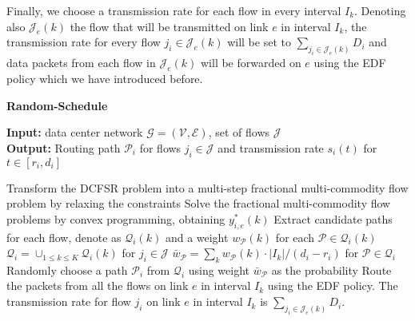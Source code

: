 \documentclass[10pt, conference, compsocconf]{IEEEtran}
\begin{document}
Finally, we choose a transmission rate for each flow in every interval $I_k$. Denoting also $\mathcal{J}_e(k)$ the flow that will be transmitted on link $e$ in interval $I_k$, the transmission rate for every flow $j_i \in \mathcal{J}_e(k)$ will be set to $\sum_{j_i \in \mathcal{J}_e(k)} D_i$ and data packets from each flow in $\mathcal{J}_e(k)$ will be forwarded on $e$ using the EDF policy which we have introduced before.

\begin{algorithm}[!t]
\caption{\label{alg:approx} \textbf{Random-Schedule}}
\textbf{Input:} data center network $\mathcal{G}=(\mathcal{V},\mathcal{E})$, set of flows $\mathcal{J}$\\
\textbf{Output:} Routing path $\mathcal{P}_i$ for flows $j_i \in \mathcal{J}$ and transmission rate $s_i(t)$ for $t \in [r_i,d_i]$

\begin{algorithmic}[1]
\STATE Transform the DCFSR problem into a multi-step fractional multi-commodity flow problem by relaxing the constraints
	\STATE Solve the fractional multi-commodity flow problems by convex programming, obtaining $y^*_{i,e}(k)$
	\STATE Extract candidate paths for each flow, denote as $\mathcal{Q}_i(k)$ and a weight $w_\mathcal{P}(k)$ for each $\mathcal{P} \in \mathcal{Q}_i(k)$
\ENDFOR
\STATE $\mathcal{Q}_i = \cup_{1\leq k\leq K} \mathcal{Q}_i(k)$ for $j_i \in \mathcal{J}$
\STATE $\bar{w}_\mathcal{P} = \sum_k w_\mathcal{P}(k) \cdot |I_k|/(d_i-r_i)$ for  $\mathcal{P} \in \mathcal{Q}_i$
\STATE Randomly choose a path $\mathcal{P}_i$ from $\mathcal{Q}_i$ using weight $\bar{w}_\mathcal{P}$ as the probability
\ENDFOR
\STATE Route the packets from all the flows on link $e$ in interval $I_k$ using the EDF policy. The transmission rate for flow $j_i$ on link $e$ in interval $I_k$ is $\sum_{j_i \in \mathcal{J}_e(k)} D_i$.
\end{algorithmic}
\end{algorithm}
\end{document}
